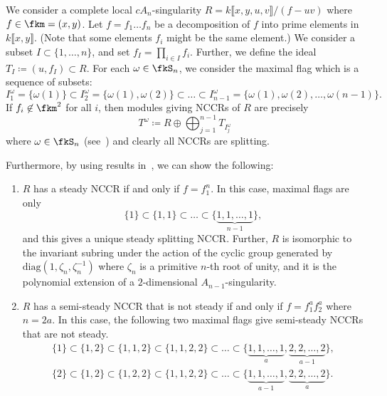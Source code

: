\begin{exem}\label{cAn-sing}
We consider a complete local $cA_n$-singularity $R=k\llbracket x,y,u,v\rrbracket /(f-uv)$ where $f\in\fkm=(x,y)$. Let $f=f_1\dots f_n$ be a decomposition of $f$ into prime elements in $k\llbracket x,y\rrbracket $. (Note that some elements $f_i$ might be the same element.) We consider a subset $I\subset\{1,\dots,n\}$, and set $f_I=\prod_{i\in I}f_i$. Further, we define the ideal $T_I\coloneqq (u,f_I)\subset R$. For each $\omega\in\fkS_n$, we consider the maximal flag which is a sequence of subsets:
\[
I_1^\omega=\{\omega(1)\}\subset I_2^\omega=\{\omega(1),\omega(2)\}\subset\dots\subset I_{n-1}^\omega=\{\omega(1),\omega(2),\dots,\omega(n-1)\}.
\]
If $f_i\not\in\fkm^2$ for all $i$, then modules giving NCCRs of $R$ are precisely
\[
T^\omega\coloneqq R\oplus\bigoplus^{n-1}_{j=1}T_{I_j^\omega}
\]
where $\omega\in\fkS_n$ (see~\cite[Theorem~5.1]{IW4})
and clearly all NCCRs are splitting.

Furthermore, by using results in~\cite[Section~5]{IW4}, we can show the following:
\begin{enumerate}%
\item $R$ has a steady NCCR if and only if $f=f_1^n$. In this case, maximal flags are only
\[
\{1\}\subset\{1, 1\}\subset\dots\subset\{\underbrace{1,1,\dots,1}_{n-1}\},
\]
and this gives a unique steady splitting NCCR. Further, $R$ is isomorphic to the invariant subring under the action of the cyclic group generated by $\mathrm{diag}(1,\zeta_n,\zeta^{-1}_n)$ where $\zeta_n$ is a primitive $n$-th root of unity, and it is the polynomial extension of a $2$-dimensional $A_{n-1}$-singularity.
\item $R$ has a semi-steady NCCR that is not steady if and only if $f=f_1^af_2^a$ where $n=2a$. In this case, the following two maximal flags give semi-steady NCCRs that are not steady.
\begin{gather*}
\{1\}\subset\{1,2\}\subset\{1,1,2\}\subset\{1,1,2,2\}\subset\dots\subset\{\underbrace{1,1,\dots,1}_{a},\underbrace{2,2,\dots,2}_{a-1}\},
\\
\{2\}\subset\{1,2\}\subset\{1,2,2\}\subset\{1,1,2,2\}\subset\dots\subset\{\underbrace{1,1,\dots,1}_{a-1},\underbrace{2,2,\dots,2}_{a}\}.
\end{gather*}
\end{enumerate}
\end{exem}


